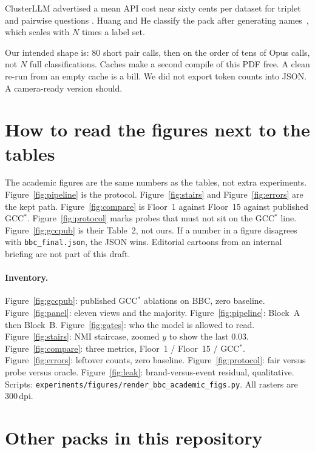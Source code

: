 \documentclass[11pt,a4paper]{article}
\begin{document}
ClusterLLM advertised a mean API cost near sixty cents per
dataset for triplet and pairwise questions
\cite{zhang2023clusterllm}. Huang and He classify the pack
after generating names~\cite{huang2024tcllc}, which scales
with $N$ times a label set.

Our intended shape is: $80$ short pair calls, then on the
order of tens of Opus calls, not $N$ full classifications.
Caches make a second compile of this PDF free. A clean
re-run from an empty cache is a bill. We did not export
token counts into JSON. A camera-ready version should.

\section{How to read the figures next to the tables}

The academic figures are the same numbers as the tables,
not extra experiments. Figure~\ref{fig:pipeline} is the
protocol. Figure~\ref{fig:stairs} and Figure~\ref{fig:errors}
are the kept path. Figure~\ref{fig:compare} is Floor~1
against Floor~15 against published GCC$^*$.
Figure~\ref{fig:protocol} marks probes that must not sit
on the GCC$^*$ line. Figure~\ref{fig:gccpub} is their
Table~2, not ours. If a number in a figure disagrees with
\texttt{bbc\_final.json}, the JSON wins. Editorial cartoons
from an internal briefing are not part of this draft.

\paragraph{Inventory.}
Figure~\ref{fig:gccpub}: published GCC$^*$ ablations on BBC,
zero baseline. Figure~\ref{fig:panel}: eleven views and the
majority. Figure~\ref{fig:pipeline}: Block~A then Block~B.
Figure~\ref{fig:gates}: who the model is allowed to read.
Figure~\ref{fig:stairs}: NMI staircase, zoomed $y$ to show
the last $0.03$. Figure~\ref{fig:compare}: three metrics,
Floor~1 / Floor~15 / GCC$^*$. Figure~\ref{fig:errors}:
leftover counts, zero baseline. Figure~\ref{fig:protocol}:
fair versus probe versus oracle. Figure~\ref{fig:leak}:
brand-versus-event residual, qualitative. Scripts:
\texttt{experiments/figures/render\_bbc\_academic\_figs.py}.
All rasters are $300$\,dpi.

\section{Other packs in this repository}
\end{document}
